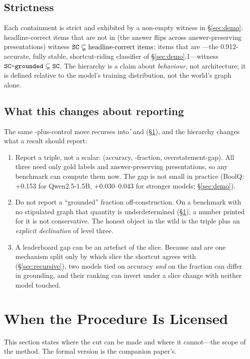 \subsection{Strictness}
Each containment is strict and exhibited by a non-empty witness in
\S\ref{sec:demo}: headline-correct items that are not in \SC{} (the answer
flips across answer-preserving presentations) witness
$\texttt{SC}{} \subsetneq \text{headline-correct items}$; \SC{} items that are
\scs{}---the 0.912-accurate, fully stable, shortcut-riding classifier of
\S\ref{sec:demo}.1---witness $\texttt{SC-grounded}{} \subsetneq \texttt{SC}{}$. The hierarchy is a
claim about \emph{behaviour}, not architecture; it is defined relative to
the model's training distribution, not the world's graph alone.

\subsection{What this changes about reporting}
The same \doc{}-plus-control move recurses into \U{} and \SW{}
(\S\ref{sec:licensed}), and the hierarchy changes what a result should
report:
\begin{enumerate}\itemsep2pt
  \item Report a triple, not a scalar: (accuracy, \SC{}-fraction,
  overstatement-gap). All three need only gold labels and answer-preserving
  presentations, so any benchmark can compute them now. The gap is not small in
  practice (BoolQ: +0.153 for Qwen2.5-1.5B, +0.030--0.043 for stronger
  models; \S\ref{sec:demo}).
  \item Do not report a ``grounded'' fraction off-construction. On a
  benchmark with no stipulated graph that quantity is underdetermined
  (\S\ref{sec:licensed}); a number printed for it is not conservative. The honest
  object in the wild is the triple plus an \emph{explicit declination} of level
  three.
  \item A leaderboard gap can be an artefact of the slice. Because \scs{}
  and \swsc{} are one mechanism split only by which slice the shortcut agrees
  with (\S\ref{sec:recursive}), two models tied on accuracy \emph{and} on the
  \SC{} fraction can differ in grounding, and their ranking can invert under
  a slice change with neither model touched.
\end{enumerate}

\section{When the Procedure Is Licensed}\label{sec:licensed}
This section states where the cut can be made and where it cannot---the scope of
the method. The formal version is the companion paper's.

